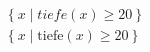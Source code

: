 \begin{align*}
  \left\lbrace x \mid tiefe(x) \geq 20 \right\rbrace \\
  \left\lbrace x \mid \mathrm{tiefe}(x) \geq 20 \right\rbrace
\end{align*}